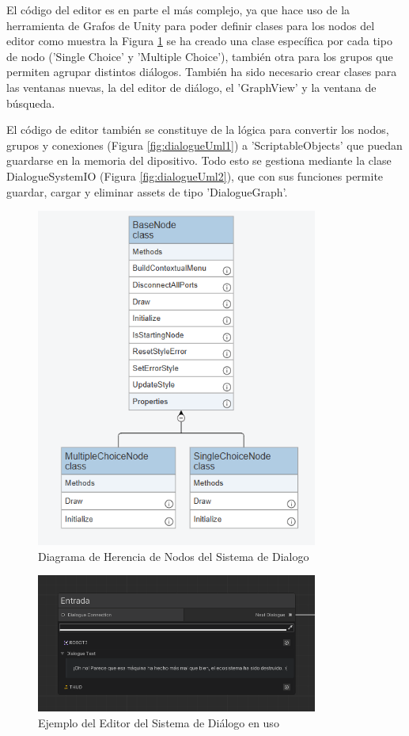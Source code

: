 El código del editor es en parte el más complejo, ya que hace uso de la herramienta de Grafos de Unity para poder definir clases para los nodos del editor como muestra la 
Figura \ref{fig:nodos} se ha creado una clase específica por cada tipo de nodo ('Single Choice' y 'Multiple Choice'), también otra para los grupos que permiten agrupar distintos 
diálogos. También ha sido necesario crear clases para las ventanas nuevas, la del editor de diálogo, el 'GraphView' y la ventana de búsqueda.

El código de editor también se constituye de la lógica para convertir los nodos, grupos y conexiones (Figura \ref{fig:dialogueUml1}) a 'ScriptableObjects' que puedan guardarse en la memoria del dipositivo. Todo esto se gestiona mediante la clase
DialogueSystemIO (Figura \ref{fig:dialogueUml2}), que con sus funciones permite guardar, cargar y eliminar assets de tipo 'DialogueGraph'.  

\begin{figure}[H]
  \centering
    \includegraphics[width=350px,clip=true]{Node_Herencia.png}
  \caption{Diagrama de Herencia de Nodos del Sistema de Dialogo}
  \label{fig:nodos}
\end{figure}

\begin{figure}[H]
  \centering
    \includegraphics[width=350px,clip=true]{dialogue.png}
  \caption{Ejemplo del Editor del Sistema de Diálogo en uso}
  \label{fig:dialogueEditorExample}
\end{figure}

